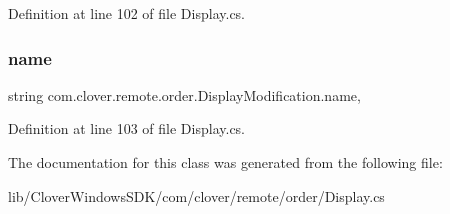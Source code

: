 Definition at line 102 of file Display.\+cs.

\mbox{\label{classcom_1_1clover_1_1remote_1_1order_1_1_display_modification_a034743d3e96712e47a62dda8b0463b50}} 
\subsubsection{\texorpdfstring{name}{name}}
{\footnotesize\ttfamily string com.\+clover.\+remote.\+order.\+Display\+Modification.\+name\hspace{0.3cm}{\ttfamily [get]}, {\ttfamily [set]}}



Definition at line 103 of file Display.\+cs.



The documentation for this class was generated from the following file\+:\begin{DoxyCompactItemize}
\item 
lib/\+Clover\+Windows\+S\+D\+K/com/clover/remote/order/Display.\+cs\end{DoxyCompactItemize}
